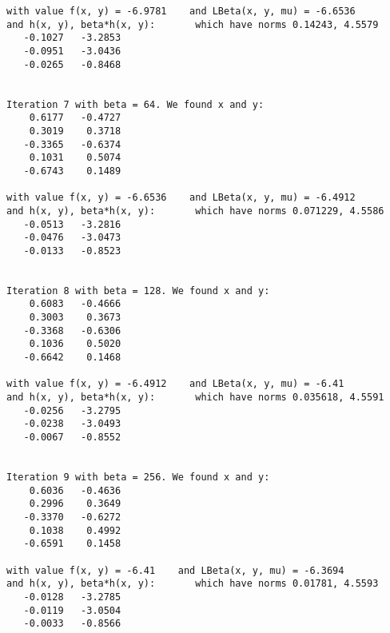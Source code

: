 \documentclass{article}
\begin{document}
\begin{lstlisting}
with value f(x, y) = -6.9781    and LBeta(x, y, mu) = -6.6536
and h(x, y), beta*h(x, y):       which have norms 0.14243, 4.5579
   -0.1027   -3.2853
   -0.0951   -3.0436
   -0.0265   -0.8468


Iteration 7 with beta = 64. We found x and y:
    0.6177   -0.4727
    0.3019    0.3718
   -0.3365   -0.6374
    0.1031    0.5074
   -0.6743    0.1489

with value f(x, y) = -6.6536    and LBeta(x, y, mu) = -6.4912
and h(x, y), beta*h(x, y):       which have norms 0.071229, 4.5586
   -0.0513   -3.2816
   -0.0476   -3.0473
   -0.0133   -0.8523


Iteration 8 with beta = 128. We found x and y:
    0.6083   -0.4666
    0.3003    0.3673
   -0.3368   -0.6306
    0.1036    0.5020
   -0.6642    0.1468

with value f(x, y) = -6.4912    and LBeta(x, y, mu) = -6.41
and h(x, y), beta*h(x, y):       which have norms 0.035618, 4.5591
   -0.0256   -3.2795
   -0.0238   -3.0493
   -0.0067   -0.8552


Iteration 9 with beta = 256. We found x and y:
    0.6036   -0.4636
    0.2996    0.3649
   -0.3370   -0.6272
    0.1038    0.4992
   -0.6591    0.1458

with value f(x, y) = -6.41    and LBeta(x, y, mu) = -6.3694
and h(x, y), beta*h(x, y):       which have norms 0.01781, 4.5593
   -0.0128   -3.2785
   -0.0119   -3.0504
   -0.0033   -0.8566
\end{lstlisting}
\end{document}
